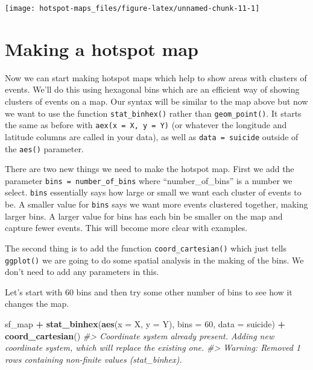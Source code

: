 \documentclass[
  12pt,
]{book}
\newenvironment{Shaded}{\begin{snugshade}}{\end{snugshade}}
\newcommand{\CommentTok}[1]{\textcolor[rgb]{0.56,0.35,0.01}{\textit{#1}}}
\newcommand{\DataTypeTok}[1]{\textcolor[rgb]{0.13,0.29,0.53}{#1}}
\newcommand{\DecValTok}[1]{\textcolor[rgb]{0.00,0.00,0.81}{#1}}
\newcommand{\KeywordTok}[1]{\textcolor[rgb]{0.13,0.29,0.53}{\textbf{#1}}}
\newcommand{\NormalTok}[1]{#1}
\newcommand{\OperatorTok}[1]{\textcolor[rgb]{0.81,0.36,0.00}{\textbf{#1}}}
\newcommand{\StringTok}[1]{\textcolor[rgb]{0.31,0.60,0.02}{#1}}
\begin{document}
\begin{Shaded}
\end{Shaded}

\begin{center}\texttt{[image: hotspot-maps\_files/figure-latex/unnamed-chunk-11-1]} \end{center}

\hypertarget{making-a-hotspot-map}{%
\section{Making a hotspot map}\label{making-a-hotspot-map}}

Now we can start making hotspot maps which help to show areas with clusters of events. We'll do this using hexagonal bins which are an efficient way of showing clusters of events on a map. Our syntax will be similar to the map above but now we want to use the function \texttt{stat\_binhex()} rather than \texttt{geom\_point()}. It starts the same as before with \texttt{aex(x\ =\ X,\ y\ =\ Y)} (or whatever the longitude and latitude columns are called in your data), as well as \texttt{data\ =\ suicide} outside of the \texttt{aes()} parameter.

There are two new things we need to make the hotspot map. First we add the parameter \texttt{bins\ =\ number\_of\_bins} where ``number\_of\_bins'' is a number we select. \texttt{bins} essentially says how large or small we want each cluster of events to be. A smaller value for \texttt{bins} says we want more events clustered together, making larger bins. A larger value for bins has each bin be smaller on the map and capture fewer events. This will become more clear with examples.

The second thing is to add the function \texttt{coord\_cartesian()} which just tells \texttt{ggplot()} we are going to do some spatial analysis in the making of the bins. We don't need to add any parameters in this.

Let's start with 60 bins and then try some other number of bins to see how it changes the map.

\begin{Shaded}
\begin{Highlighting}[]
\NormalTok{sf\_map }\OperatorTok{+}
\StringTok{  }\KeywordTok{stat\_binhex}\NormalTok{(}\KeywordTok{aes}\NormalTok{(}\DataTypeTok{x =}\NormalTok{ X, }\DataTypeTok{y =}\NormalTok{ Y),}
              \DataTypeTok{bins =} \DecValTok{60}\NormalTok{,}
              \DataTypeTok{data =}\NormalTok{ suicide) }\OperatorTok{+}
\StringTok{  }\KeywordTok{coord\_cartesian}\NormalTok{() }
\CommentTok{\#> Coordinate system already present. Adding new coordinate system, which will replace the existing one.}
\CommentTok{\#> Warning: Removed 1 rows containing non{-}finite values (stat\_binhex).}
\end{Highlighting}
\end{Shaded}
\end{document}
